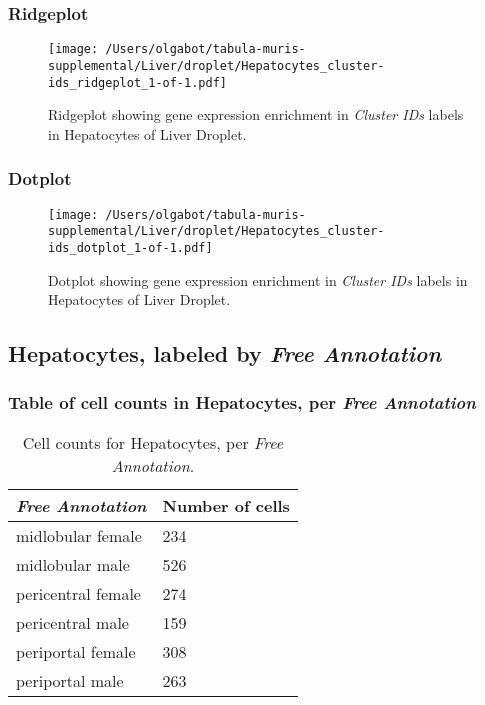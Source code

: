\clearpage

\subsubsection{Ridgeplot}
\begin{figure}[h]
\centering
\texttt{[image: /Users/olgabot/tabula-muris-supplemental/Liver/droplet/Hepatocytes\_cluster-ids\_ridgeplot\_1-of-1.pdf]}

\caption{ Ridgeplot  showing gene expression enrichment in \emph{Cluster IDs} labels in Hepatocytes of Liver Droplet. }
\end{figure}


\clearpage

\subsubsection{Dotplot}
\begin{figure}[h]
\centering
\texttt{[image: /Users/olgabot/tabula-muris-supplemental/Liver/droplet/Hepatocytes\_cluster-ids\_dotplot\_1-of-1.pdf]}

\caption{ Dotplot  showing gene expression enrichment in \emph{Cluster IDs} labels in Hepatocytes of Liver Droplet. }
\end{figure}


\clearpage

\subsection{Hepatocytes, labeled by \emph{Free Annotation}}
\subsubsection{Table of cell counts in Hepatocytes, per \emph{Free Annotation}}\begin{table}[h]
\centering
\label{my-label}
\begin{tabular}{@{}ll@{}}
\toprule

\emph{Free Annotation}& Number of cells \\ \midrule
midlobular female & 234 \\

midlobular male & 526 \\

pericentral female & 274 \\

pericentral male & 159 \\

periportal female & 308 \\

periportal male & 263 \\
\bottomrule
\end{tabular}
\caption{Cell counts for Hepatocytes, per \emph{Free Annotation}.}
\end{table}

